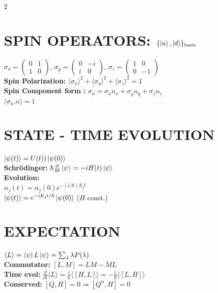 \documentclass[10pt,a4paper]{article}
\begin{document}
\begin{multicols}{2}
\section{SPIN OPERATORS: $\{\ket{u}, \ket{d}\}_{\text{basis}}$}

$\sigma_x = \begin{pmatrix}0 & 1 \\ 1 & 0\end{pmatrix}$,
$\sigma_y = \begin{pmatrix}0 & -i \\ i & 0\end{pmatrix}$,
$\sigma_z = \begin{pmatrix}1 & 0 \\ 0 & -1\end{pmatrix}$ \\

\textbf{Spin Polarization:} $\langle \sigma_x \rangle^2 + \langle \sigma_y \rangle^2 + \langle \sigma_z \rangle^2 = 1$ \\
\textbf{Spin Component form :} $\sigma_n = \sigma_x n_x + \sigma_y n_y + \sigma_z n_z$\\
$\langle \sigma_n .n \rangle = 1$\\

\section{STATE - TIME EVOLUTION}
$ \ket{\psi(t)}= U(t)) \ket{\psi(0)} $\\
\textbf{Schr\"odinger:} $\hbar \pdv{}{t}\ket{\psi} = -iH(t)\ket{\psi}$\\
\textbf{Evolution:} \\
$\alpha_j(t) = \alpha_j(0) e^{-(i/\hbar) E_j t}$\\
$\ket{\psi(t)} = e^{-iE_jt/\hbar}\ket{\psi(0)}$ ($H$ const.)\\

\section{EXPECTATION}
$\langle L \rangle = \bra{\psi}L\ket{\psi} = \sum_\lambda \lambda P(\lambda)$ \\
\textbf{Commutator:} $[L,M]=LM-ML$ \\
\textbf{Time evol:} $\frac{d}{dt}\langle L\rangle = \frac{i}{\hbar}\langle[H,L]\rangle = -\frac{i}{\hbar}\langle[L,H]\rangle$ \\
\textbf{Conserved:} $[Q,H]=0 \Rightarrow [Q^n,H]=0$\\


\end{multicols}
\end{document}
